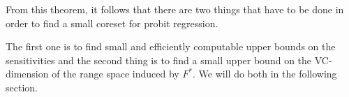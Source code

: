 From this theorem, it follows that there are two things that have to be
done in order to find a small coreset for probit regression.

The first one is to find small and efficiently computable upper bounds
on the sensitivities and the second thing is to find a
small upper bound on the VC-dimension of the range space induced by $F^\ast$.
We will do both in the following section.